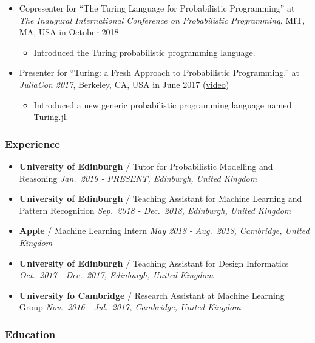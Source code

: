 \documentclass[11pt, a4paper]{article}
\providecommand{\tightlist}{%
  \setlength{\itemsep}{0pt}\setlength{\parskip}{0pt}}
\begin{document}
\begin{raggedright}
\begin{itemize}
\tightlist
\item
  Copresenter for ``The Turing Language for Probabilistic Programming''
  at \emph{The Inaugural International Conference on Probabilistic
  Programming}, MIT, MA, USA in October 2018

  \begin{itemize}
  \tightlist
  \item
    Introduced the Turing probabilistic programming language.
  \end{itemize}
\item
  Presenter for ``Turing: a Fresh Approach to Probabilistic
  Programming.'' at \emph{JuliaCon 2017}, Berkeley, CA, USA in June 2017
  (\href{https://www.youtube.com/watch?v=DJWNQg7uuCg}{video})

  \begin{itemize}
  \tightlist
  \item
    Introduced a new generic probabilistic programming language named
    Turing.jl.
  \end{itemize}
\end{itemize}

\subsubsection{Experience}

\begin{itemize}
\tightlist
\item
  \textbf{University of Edinburgh} / Tutor for Probabilistic Modelling
  and Reasoning \emph{Jan.~2019 - PRESENT, Edinburgh, United Kingdom}
\item
  \textbf{University of Edinburgh} / Teaching Assistant for Machine
  Learning and Pattern Recognition \emph{Sep.~2018 - Dec.~2018,
  Edinburgh, United Kingdom}
\item
  \textbf{Apple} / Machine Learning Intern \emph{May 2018 - Aug.~2018,
  Cambridge, United Kingdom}
\item
  \textbf{University of Edinburgh} / Teaching Assistant for Design
  Informatics \emph{Oct.~2017 - Dec.~2017, Edinburgh, United Kingdom}
\item
  \textbf{University fo Cambridge} / Research Assistant at Machine
  Learning Group \emph{Nov.~2016 - Jul.~2017, Cambridge, United Kingdom}
\end{itemize}

\subsubsection{Education}


\end{raggedright}
\end{document}
